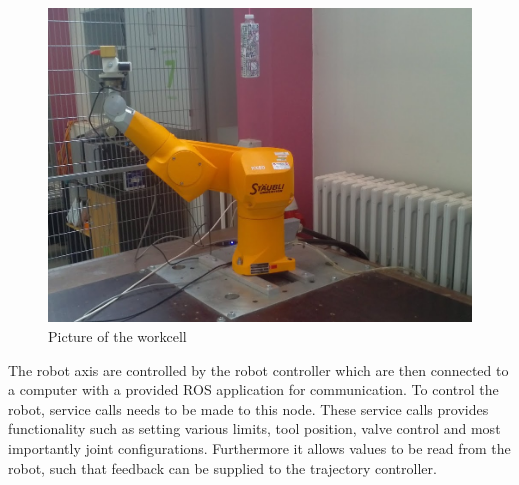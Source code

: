 \begin{figure}[htb]
	\begin{center}
		\includegraphics[scale=0.4,trim=0 0 0 0]{graphics/05_robotics/workcell.png}%
		\caption{Picture of the workcell}
		\label{fig:workcell}
	\end{center}
\end{figure}



The robot axis are controlled by the robot controller which are then connected to a computer with a provided ROS application for communication. To control the robot, service calls needs to be made to this node. These service calls provides functionality such as setting various limits, tool position, valve control and most importantly joint configurations. Furthermore it allows values to be read from the robot, such that feedback can be supplied to the trajectory controller.

